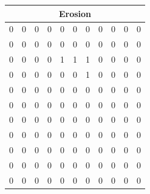 \documentclass{article}
\begin{document}
\begin{enumerate}
    \begin{center}
        \begin{tabular}{|c|c|c|c|c|c|c|c|c|c|c|}
        \multicolumn{11}{c}{\textbf{Erosion}} \\
        \hline
        0 & 0 & 0 & 0 & 0 & 0 & 0 & 0 & 0 & 0 & 0 \\
        \hline
        0 & 0 & 0 & 0 & 0 & 0 & 0 & 0 & 0 & 0 & 0 \\
        \hline
        0 & 0 & 0 & 0 & \cellcolor{blue!20}1 & \cellcolor{blue!20}1 & \cellcolor{blue!20}1 & 0 & 0 & 0 & 0 \\
        \hline
        0 & 0 & 0 & 0 & 0 & 0 & \cellcolor{blue!20}1 & 0 & 0 & 0 & 0 \\
        \hline
        0 & 0 & 0 & 0 & 0 & 0 & 0 & 0 & 0 & 0 & 0 \\
        \hline
        0 & 0 & 0 & 0 & 0 & 0 & 0 & 0 & 0 & 0 & 0 \\
        \hline
        0 & 0 & 0 & 0 & 0 & 0 & 0 & 0 & 0 & 0 & 0 \\
        \hline
        0 & 0 & 0 & 0 & 0 & 0 & 0 & 0 & 0 & 0 & 0 \\
        \hline
        0 & 0 & 0 & 0 & 0 & 0 & 0 & 0 & 0 & 0 & 0 \\
        \hline
        0 & 0 & 0 & 0 & 0 & 0 & 0 & 0 & 0 & 0 & 0 \\
        \hline
        0 & 0 & 0 & 0 & 0 & 0 & 0 & 0 & 0 & 0 & 0 \\
        \hline
        \end{tabular}
    \end{center}


\end{enumerate}
\end{document}
